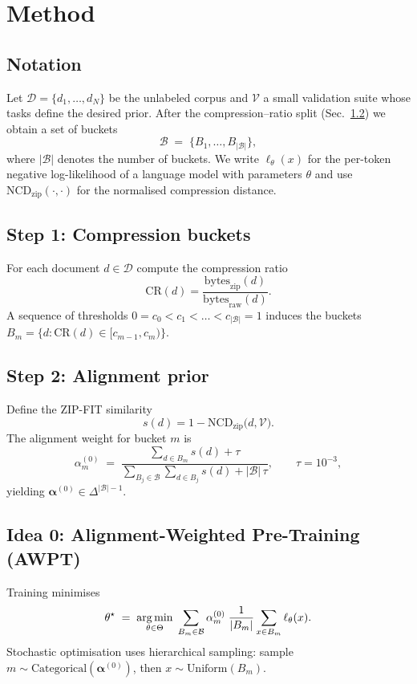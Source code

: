 \documentclass{article}
\begin{document}
\section{Method}\label{sec:method}

\subsection{Notation}\label{sec:notation}
Let $\mathcal{D}=\{d_1,\dots,d_N\}$ be the unlabeled corpus and
$\mathcal{V}$ a small validation suite whose tasks define the desired
prior.
After the compression–ratio split (Sec.~\ref{sec:buckets}) we obtain a
set of buckets
\[
  \mathcal{B} \;=\;\bigl\{B_1,\dots,B_{\lvert\mathcal{B}\rvert}\bigr\},
\]
where $\lvert\mathcal{B}\rvert$ denotes the number of buckets.
We write $\ell_{\theta}(x)$ for the per-token negative log-likelihood of a
language model with parameters $\theta$ and use
$\mathrm{NCD}_{\!\mathrm{zip}}(\cdot,\cdot)$ for the normalised
compression distance.

\subsection{Step 1: Compression buckets}\label{sec:buckets}
For each document $d\in\mathcal{D}$ compute the compression ratio
\begin{equation}
\mathrm{CR}(d)=
\frac{\text{bytes}_{\text{zip}}(d)}
     {\text{bytes}_{\text{raw}}(d)}.
\end{equation}
A sequence of thresholds
$0=c_0<c_1<\dots<c_{\lvert\mathcal{B}\rvert}=1$ induces the
buckets $B_m=\{d\!:\!\mathrm{CR}(d)\in[c_{m-1},c_m)\}$.

\subsection{Step 2: Alignment prior}\label{sec:prior}
Define the ZIP-FIT similarity
\[
  s(d)=1-\mathrm{NCD}_{\!\mathrm{zip}}\bigl(d,\mathcal{V}\bigr).
\]
The alignment weight for bucket $m$ is
\begin{equation}\label{eq:alpha0-b}
\alpha^{(0)}_m \;=\;
\frac{\sum_{d\in B_m}s(d)+\tau}
     {\sum_{B_j\in\mathcal{B}}\sum_{d\in B_j}s(d)
      +\lvert\mathcal{B}\rvert\,\tau},
\qquad
\tau=10^{-3},
\end{equation}
yielding $\boldsymbol{\alpha}^{(0)}\in\Delta^{\lvert\mathcal{B}\rvert-1}$.

\subsection{Idea 0: Alignment-Weighted Pre-Training (AWPT)}
Training minimises
\begin{equation}\label{eq:awpt-final}
\theta^\star\;=\;
\operatorname*{arg\,min}_{\theta\in\Theta}\;
\sum_{B_m\in\mathcal{B}}
\alpha^{(0)}_m\;\frac{1}{\lvert B_m\rvert}
\sum_{x\in B_m} \ell_\theta(x).
\end{equation}
Stochastic optimisation uses hierarchical sampling:
sample $m\!\sim\!\text{Categorical}(\boldsymbol{\alpha}^{(0)})$, then
$x\!\sim\!\text{Uniform}(B_m)$.
\end{document}
